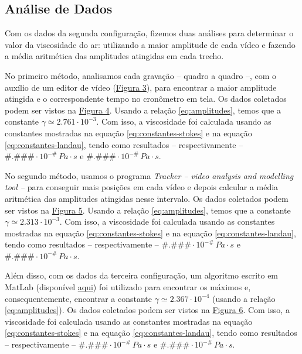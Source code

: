 \documentclass[a4paper, 12pt]{article}
\begin{document}
\begin{multicols}{2}
		\section{Análise de Dados} \label{sec:analise}
			\par Com os dados da segunda configuração, fizemos duas análises para determinar o valor da viscosidade do ar: utilizando a maior amplitude de cada vídeo e fazendo a média aritmética das amplitudes atingidas em cada trecho.
			\par No primeiro método, analisamos cada gravação -- quadro a quadro --, com o auxílio de um editor de vídeo (\hyperref[img:quadros]{Figura 3}), para encontrar a maior amplitude atingida e o correspondente tempo no cronômetro em tela. Os dados coletados podem ser vistos na \hyperref[img:m1]{Figura 4}. Usando a relação \hyperref[eq:amplitudes]{\ref{eq:amplitudes}}, temos que a constante $\gamma \simeq 2.761 \cdot 10^{-3}$. Com isso, a viscosidade foi calculada usando as constantes mostradas na equação \hyperref[eq:constantes-stokes]{\ref{eq:constantes-stokes}} e na equação \hyperref[eq:constantes-landau]{\ref{eq:constantes-landau}}, tendo como resultados -- respectivamente -- $\#.\#\#\# \cdot 10^{-\#} \, Pa \cdot s$ e $\#.\#\#\# \cdot 10^{-\#} \, Pa \cdot s$.
			\par No segundo método, usamos o programa \textit{Tracker -- video analysis and modelling tool --} para conseguir mais posições em cada vídeo e depois calcular a média aritmética das amplitudes atingidas nesse intervalo. Os dados coletados podem ser vistos na \hyperref[img:m2]{Figura 5}. Usando a relação \hyperref[eq:amplitudes]{\ref{eq:amplitudes}}, temos que a constante $\gamma \simeq 2.313 \cdot 10^{-3}$. Com isso, a viscosidade foi calculada usando as constantes mostradas na equação \hyperref[eq:constantes-stokes]{\ref{eq:constantes-stokes}} e na equação \hyperref[eq:constantes-landau]{\ref{eq:constantes-landau}}, tendo como resultados -- respectivamente -- $\#.\#\#\# \cdot 10^{-\#} \, Pa \cdot s$ e $\#.\#\#\# \cdot 10^{-\#} \, Pa \cdot s$.
			\par Além disso, com os dados da terceira configuração, um algoritmo escrito em MatLab (disponível \href{https://github.com/hugoalkimim/ViscosidadeDoAr/tree/master/Algoritmo}{aqui}) foi utilizado para encontrar os máximos e, consequentemente, encontrar a constante $\gamma \simeq 2.367 \cdot 10^{-4}$ (usando a relação \hyperref[eq:amplitudes]{\ref{eq:amplitudes}}). Os dados coletados podem ser vistos na \hyperref[img:m3]{Figura 6}. Com isso, a viscosidade foi calculada usando as constantes mostradas na equação \hyperref[eq:constantes-stokes]{\ref{eq:constantes-stokes}} e na equação \hyperref[eq:constantes-landau]{\ref{eq:constantes-landau}}, tendo como resultados -- respectivamente -- $\#.\#\#\# \cdot 10^{-\#} \, Pa \cdot s$ e $\#.\#\#\# \cdot 10^{-\#} \, Pa \cdot s$.

\end{multicols}
\end{document}
